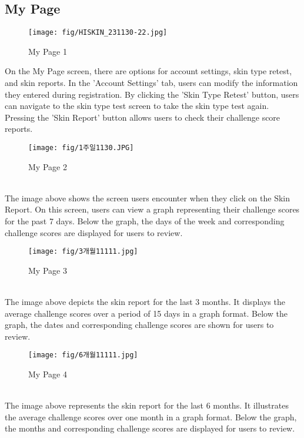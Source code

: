 \documentclass[conference]{IEEEtran}
\begin{document}
\subsection{My Page}
\begin{figure}[h]
    \centering
    \texttt{[image: fig/HISKIN\_231130-22.jpg]}
    \label{fig:My Page 1}
    \caption{My Page 1} 
    \end{figure}
On the My Page screen, there are options for account settings, skin type retest, and skin reports. In the 'Account Settings' tab, users can modify the information they entered during registration. By clicking the 'Skin Type Retest' button, users can navigate to the skin type test screen to take the skin type test again. Pressing the 'Skin Report' button allows users to check their challenge score reports.\\
\begin{figure}[h]
    \centering
    \texttt{[image: fig/1주일1130.JPG]}
    \label{fig:My Page 2}
    \caption{My Page 2} 
    \end{figure}
\\The image above shows the screen users encounter when they click on the Skin Report. On this screen, users can view a graph representing their challenge scores for the past 7 days. Below the graph, the days of the week and corresponding challenge scores are displayed for users to review.\\
\begin{figure}[h]
    \centering
    \texttt{[image: fig/3개월11111.jpg]}
    \label{fig:My Page 3}
    \caption{My Page 3} 
    \end{figure}
\\The image above depicts the skin report for the last 3 months. It displays the average challenge scores over a period of 15 days in a graph format. Below the graph, the dates and corresponding challenge scores are shown for users to review.\\
\begin{figure}[h]
    \centering
    \texttt{[image: fig/6개월11111.jpg]}
    \label{fig:My Page 4}
    \caption{My Page 4} 
    \end{figure}
\\The image above represents the skin report for the last 6 months. It illustrates the average challenge scores over one month in a graph format. Below the graph, the months and corresponding challenge scores are displayed for users to review.



 

\end{document}
